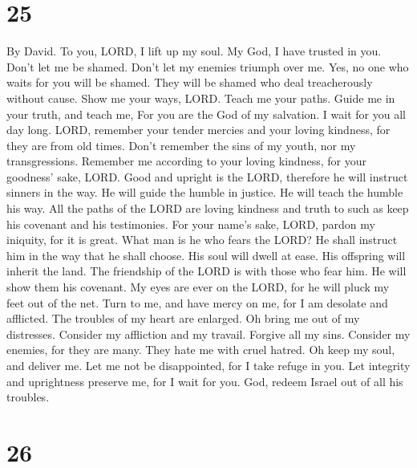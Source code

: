 \hypertarget{section-24}{%
\section{25}\label{section-24}}

By David.  To you, LORD, I lift up my soul.  My
God, I have trusted in you. Don't let me be shamed. Don't let my enemies
triumph over me.  Yes, no one who waits for you will be
shamed. They will be shamed who deal treacherously without cause.
 Show me your ways, LORD. Teach me your paths. 
Guide me in your truth, and teach me, For you are the God of my
salvation. I wait for you all day long.  LORD, remember your
tender mercies and your loving kindness, for they are from old times.
 Don't remember the sins of my youth, nor my transgressions.
Remember me according to your loving kindness, for your goodness' sake,
LORD.  Good and upright is the LORD, therefore he will
instruct sinners in the way.  He will guide the humble in
justice. He will teach the humble his way.  All the paths
of the LORD are loving kindness and truth to such as keep his covenant
and his testimonies.  For your name's sake, LORD, pardon my
iniquity, for it is great.  What man is he who fears the
LORD? He shall instruct him in the way that he shall choose.
 His soul will dwell at ease. His offspring will inherit
the land.  The friendship of the LORD is with those who
fear him. He will show them his covenant.  My eyes are ever
on the LORD, for he will pluck my feet out of the net. 
Turn to me, and have mercy on me, for I am desolate and afflicted.
 The troubles of my heart are enlarged. Oh bring me out of
my distresses.  Consider my affliction and my travail.
Forgive all my sins.  Consider my enemies, for they are
many. They hate me with cruel hatred.  Oh keep my soul, and
deliver me. Let me not be disappointed, for I take refuge in you.
 Let integrity and uprightness preserve me, for I wait for
you.  God, redeem Israel out of all his troubles.

\hypertarget{section-25}{%
\section{26}\label{section-25}}


